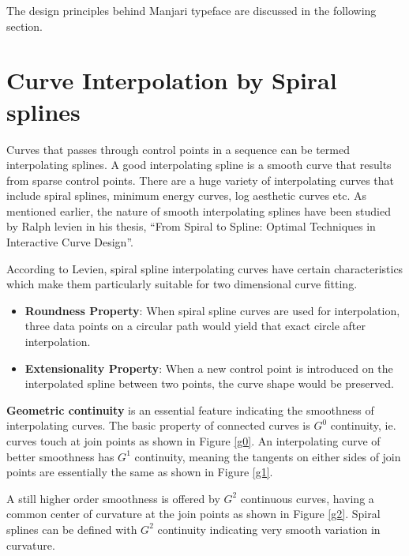\documentclass[11pt,twoside,a4paper,parskip=half]{scrartcl}
\begin{document}
 
The design principles behind Manjari typeface are discussed in the following section.
\clearpage

\section{Curve Interpolation by Spiral splines}

Curves that passes through control points in a sequence can be termed interpolating splines. A good interpolating spline is a smooth curve that results from sparse control points. There are a huge variety of interpolating curves that include spiral splines, minimum energy curves, log aesthetic curves etc. As mentioned earlier, the nature of smooth interpolating splines have been studied by Ralph levien in his thesis, ``From Spiral to Spline: Optimal Techniques in Interactive Curve Design”\cite{levien}.

According to Levien, spiral spline interpolating curves have certain characteristics which make them particularly suitable for two dimensional curve fitting.
\begin{itemize}
	
	\item \textbf{Roundness Property}: When spiral spline curves are used for interpolation, three data points on a circular path would yield that exact circle after interpolation.
	\item \textbf{Extensionality Property}: When a new control point is introduced on the interpolated spline between two points, the curve shape would be preserved.
\end{itemize}

\textbf{Geometric continuity} is an essential feature indicating the smoothness of interpolating curves. The basic property of connected curves is $G^0$ continuity, ie. curves touch at join points as shown in Figure \ref{g0}. An interpolating curve of better smoothness has $G^1$ continuity, meaning the tangents on either sides of join points are essentially the same as shown in Figure \ref{g1}. 

A still higher order smoothness is offered by $G^2$ continuous curves, having a common center of curvature at the join points as shown in Figure \ref{g2}. Spiral splines can be defined with $G^2$ continuity indicating very smooth variation in curvature. 
\end{document}
